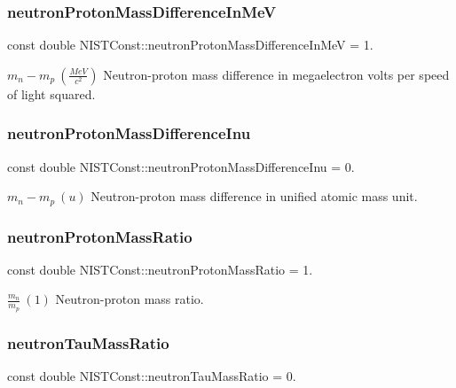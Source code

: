 \subsubsection{\texorpdfstring{neutron\+Proton\+Mass\+Difference\+In\+MeV}{neutronProtonMassDifferenceInMeV}}
{\footnotesize\ttfamily const double N\+I\+S\+T\+Const\+::neutron\+Proton\+Mass\+Difference\+In\+MeV = 1.}

$m_n - m_p \ (\frac{MeV}{c^2})$ Neutron-\/proton mass difference in megaelectron volts per speed of light squared. \mbox{\label{group___neutron_ga570caff89957976a8486d25e5288df51}} 
\subsubsection{\texorpdfstring{neutron\+Proton\+Mass\+Difference\+Inu}{neutronProtonMassDifferenceInu}}
{\footnotesize\ttfamily const double N\+I\+S\+T\+Const\+::neutron\+Proton\+Mass\+Difference\+Inu = 0.}

$m_n - m_p \ (u)$ Neutron-\/proton mass difference in unified atomic mass unit. \mbox{\label{group___neutron_gad8a08222b3de2105b5b399faa5a59fbd}} 
\subsubsection{\texorpdfstring{neutron\+Proton\+Mass\+Ratio}{neutronProtonMassRatio}}
{\footnotesize\ttfamily const double N\+I\+S\+T\+Const\+::neutron\+Proton\+Mass\+Ratio = 1.}

$\frac{m_n}{m_p} \ (1)$ Neutron-\/proton mass ratio. \mbox{\label{group___neutron_ga9c3ba7b26cbcc0b2f7f7fa551812683a}} 
\subsubsection{\texorpdfstring{neutron\+Tau\+Mass\+Ratio}{neutronTauMassRatio}}
{\footnotesize\ttfamily const double N\+I\+S\+T\+Const\+::neutron\+Tau\+Mass\+Ratio = 0.}

